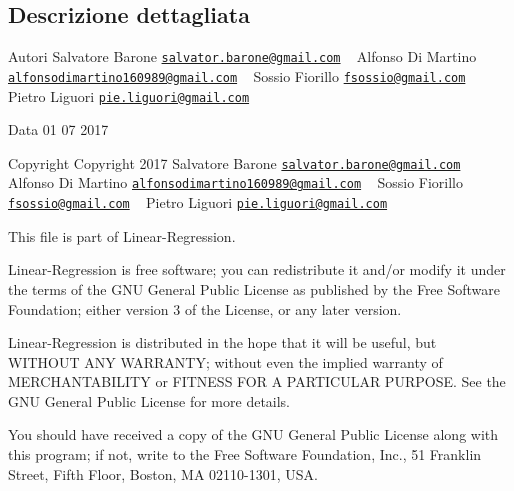\subsection{Descrizione dettagliata}
\begin{DoxyAuthor}{Autori}
Salvatore Barone \href{mailto:salvator.barone@gmail.com}{\tt salvator.\+barone@gmail.\+com} ~\newline
 Alfonso Di Martino \href{mailto:alfonsodimartino160989@gmail.com}{\tt alfonsodimartino160989@gmail.\+com} ~\newline
 Sossio Fiorillo \href{mailto:fsossio@gmail.com}{\tt fsossio@gmail.\+com} ~\newline
 Pietro Liguori \href{mailto:pie.liguori@gmail.com}{\tt pie.\+liguori@gmail.\+com} ~\newline

\end{DoxyAuthor}
\begin{DoxyDate}{Data}
01 07 2017
\end{DoxyDate}
\begin{DoxyCopyright}{Copyright}
Copyright 2017 Salvatore Barone \href{mailto:salvator.barone@gmail.com}{\tt salvator.\+barone@gmail.\+com} ~\newline
 Alfonso Di Martino \href{mailto:alfonsodimartino160989@gmail.com}{\tt alfonsodimartino160989@gmail.\+com} ~\newline
 Sossio Fiorillo \href{mailto:fsossio@gmail.com}{\tt fsossio@gmail.\+com} ~\newline
 Pietro Liguori \href{mailto:pie.liguori@gmail.com}{\tt pie.\+liguori@gmail.\+com} ~\newline

\end{DoxyCopyright}
This file is part of Linear-\/\+Regression.

Linear-\/\+Regression is free software; you can redistribute it and/or modify it under the terms of the G\+N\+U General Public License as published by the Free Software Foundation; either version 3 of the License, or any later version.

Linear-\/\+Regression is distributed in the hope that it will be useful, but W\+I\+T\+H\+O\+U\+T A\+N\+Y W\+A\+R\+R\+A\+N\+T\+Y; without even the implied warranty of M\+E\+R\+C\+H\+A\+N\+T\+A\+B\+I\+L\+I\+T\+Y or F\+I\+T\+N\+E\+S\+S F\+O\+R A P\+A\+R\+T\+I\+C\+U\+L\+A\+R P\+U\+R\+P\+O\+S\+E. See the G\+N\+U General Public License for more details.

You should have received a copy of the G\+N\+U General Public License along with this program; if not, write to the Free Software Foundation, Inc., 51 Franklin Street, Fifth Floor, Boston, M\+A 02110-\/1301, U\+S\+A. 
